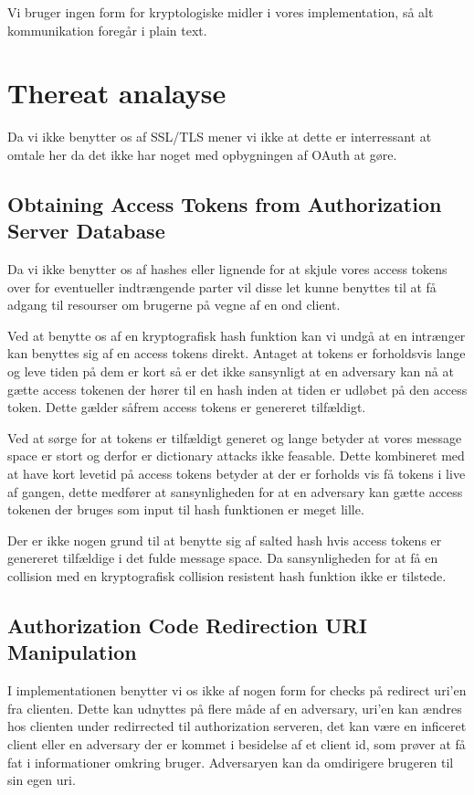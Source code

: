 \documentclass[a4paper,12pt]{article}
\theoremstyle{plain}
\theoremstyle{nonumberplain}
\begin{document}
Vi bruger ingen form for kryptologiske midler i vores implementation, så alt kommunikation foregår i plain text.

\section*{Thereat analayse}
Da vi ikke benytter os af SSL/TLS mener vi ikke at dette er interressant at omtale her da det ikke har noget med opbygningen af OAuth at gøre.

\subsection*{Obtaining Access Tokens from Authorization Server Database}
Da vi ikke benytter os af hashes eller lignende for at skjule vores access tokens over for eventueller indtrængende parter vil disse let kunne benyttes til at få adgang til resourser om brugerne på vegne af en ond client.

Ved at benytte os af en kryptografisk hash funktion kan vi undgå at en intrænger kan benyttes sig af en access tokens direkt. Antaget at tokens er forholdsvis lange og leve tiden på dem er kort så er det ikke sansynligt at en adversary kan nå at gætte access tokenen der hører til en hash inden at tiden er udløbet på den access token. Dette gælder såfrem access tokens er genereret tilfældigt.

Ved at sørge for at tokens er tilfældigt generet og lange betyder at vores message space er stort og derfor er dictionary attacks ikke feasable. Dette kombineret med at have kort levetid på access tokens betyder at der er forholds vis få tokens i live af gangen, dette medfører at sansynligheden for at en adversary kan gætte access tokenen der bruges som input til hash funktionen er meget lille.

Der er ikke nogen grund til at benytte sig af salted hash hvis access tokens er genereret tilfældige i det fulde message space. Da sansynligheden for at få en collision med en kryptografisk collision resistent hash funktion ikke er tilstede.

\subsection*{Authorization Code Redirection URI Manipulation}
I implementationen benytter vi os ikke af nogen form for checks på redirect uri'en fra clienten. Dette kan udnyttes på flere måde af en adversary, uri'en kan ændres hos clienten under redirrected til authorization serveren, det kan være en inficeret client eller en adversary der er kommet i besidelse af et client id, som prøver at få fat i informationer omkring bruger. Adversaryen kan da omdirigere brugeren til sin egen uri.
\end{document}
